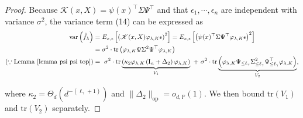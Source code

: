 \documentclass{article}
\theoremstyle{plain}
\theoremstyle{definition}
\theoremstyle{remark}
\begin{document}
\begin{appendix}
\begin{proof}
Because $\mathscr{K}(x,X) = \psi(x)^{\top} \Sigma \Psi^{\top}$ and that $\epsilon_1, \cdots, \epsilon_n$ are independent with variance $\sigma^2$, the variance term (14) can be expressed as
\begin{equation*}
    \begin{aligned}
        \mathrm{var}\left( \hat{f}_{\lambda} \right) &= E_{x, \epsilon}\left[\left(\mathscr{K}(x,X) \varphi_{\lambda, K} \epsilon \right)^2\right] = E_{x, \epsilon} \left[\left( \psi(x)^{\top} \Sigma \Psi^{\top} \varphi_{\lambda, K} \epsilon \right)^2\right]  \\
    &=  \sigma^{2} \cdot \mathrm{tr} \left( \varphi_{\lambda, K} \Psi \Sigma^{2} \Psi^{\top} \varphi_{\lambda, K} \right)\\
    (\because \text{Lemma~\ref{lemma psi psi top}})  &=~
    \sigma^{2} \cdot \mathrm{tr} \underbrace{\left(\kappa_{2}  \varphi_{\lambda, K} \left(\mathrm{I}_{n} + \Delta_{2}\right) \varphi_{\lambda, K}\right)}_{ V_{1}}  ~+~ \sigma^{2} \cdot \mathrm{tr} \underbrace{\left( \varphi_{\lambda, K} \Psi_{\leq \ell_{\gamma}} \Sigma_{\leq \ell_{\gamma}}^{2} \Psi_{\leq \ell_{\gamma}}^{\top} \varphi_{\lambda, K}\right)}_{ V_{2}},
    \end{aligned}
\end{equation*}

where $ \kappa_{2} = \Theta_{d}\left( d^{-(\ell_{\gamma}+1)} \right)$ and $\|\Delta_{2}\|_{\mathrm{op}} = o_{d, \mathbb{P}}(1)$. We then bound $\mathrm{tr}(V_1)$ and $\mathrm{tr}(V_2)$ separately.





\end{proof}
\end{appendix}
\end{document}
